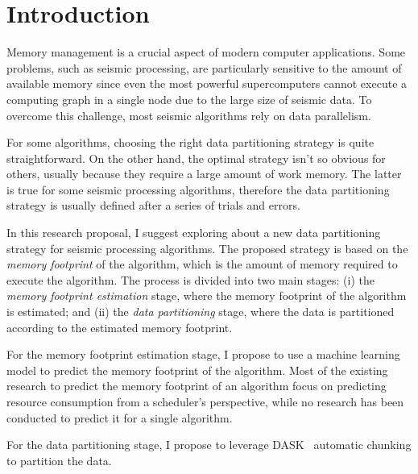 \section{Introduction}
\label{sec:introduction}

Memory management is a crucial aspect of modern computer applications.
Some problems, such as seismic processing, are particularly sensitive to the amount of available memory since even the most powerful supercomputers cannot execute a computing graph in a single node due to the large size of seismic data.
To overcome this challenge, most seismic algorithms rely on data parallelism.

For some algorithms, choosing the right data partitioning strategy is quite straightforward.
On the other hand, the optimal strategy isn't so obvious for others, usually because they require a large amount of work memory.
The latter is true for some seismic processing algorithms, therefore the data partitioning strategy is usually defined after a series of trials and errors.

In this research proposal, I suggest exploring about a new data partitioning strategy for seismic processing algorithms.
The proposed strategy is based on the \emph{memory footprint} of the algorithm, which is the amount of memory required to execute the algorithm.
The process is divided into two main stages:
(i) the \emph{memory footprint estimation} stage, where the memory footprint of the algorithm is estimated; and
(ii) the \emph{data partitioning} stage, where the data is partitioned according to the estimated memory footprint.

For the memory footprint estimation stage, I propose to use a machine learning model to predict the memory footprint of the algorithm.
Most of the existing research to predict the memory footprint of an algorithm focus on predicting resource consumption from a scheduler's perspective, while no research has been conducted to predict it for a single algorithm.

For the data partitioning stage, I propose to leverage DASK~\cite{dask} automatic chunking to partition the data.
